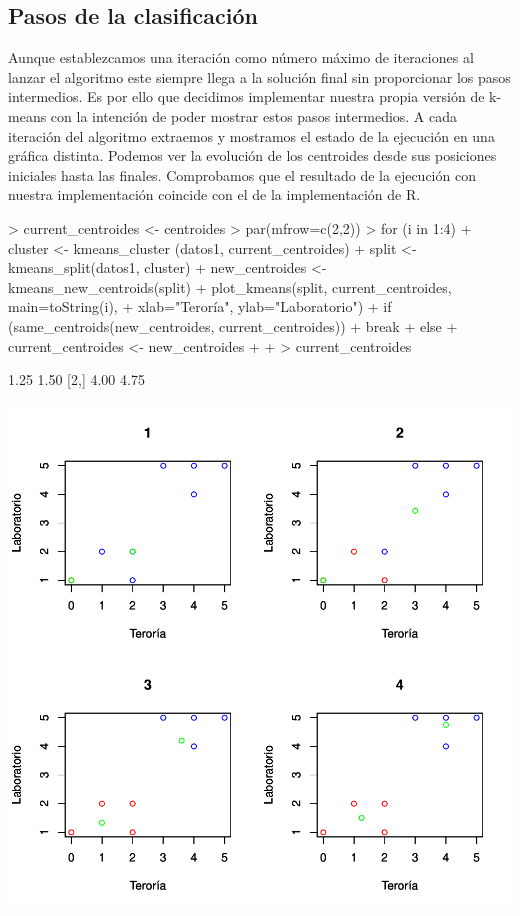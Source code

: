 \documentclass [a4paper] {article}
\begin{document}
\subsection{Pasos de la clasificación}
Aunque establezcamos una iteración como número máximo de iteraciones al lanzar el algoritmo este siempre llega a la solución final sin proporcionar los pasos intermedios.
Es por ello que decidimos implementar nuestra propia versión de k-means con la intención de poder mostrar estos pasos intermedios.
A cada iteración del algoritmo extraemos y mostramos el estado de la ejecución en una gráfica distinta.
Podemos ver la evolución de los centroides desde sus posiciones iniciales hasta las finales.
Comprobamos que el resultado de la ejecución con nuestra implementación coincide con el de la implementación de R.
\begin{center}
\begin{Schunk}
\begin{Sinput}
> current_centroides <- centroides
> par(mfrow=c(2,2))
> for (i in 1:4){
+   cluster <- kmeans_cluster (datos1, current_centroides)
+   split <- kmeans_split(datos1, cluster)
+   new_centroides <- kmeans_new_centroids(split)
+   plot_kmeans(split, current_centroides, main=toString(i),
+               xlab="Teroría", ylab="Laboratorio")
+   if (same_centroids(new_centroides, current_centroides)){
+     break
+   }else{
+     current_centroides <- new_centroides
+   }
+ }
> current_centroides
\end{Sinput}
\begin{Soutput}
     [,1] [,2]
[1,] 1.25 1.50
[2,] 4.00 4.75
\end{Soutput}
\end{Schunk}
\includegraphics{entrega-custom_kmeans}
\end{center}
\end{document}
